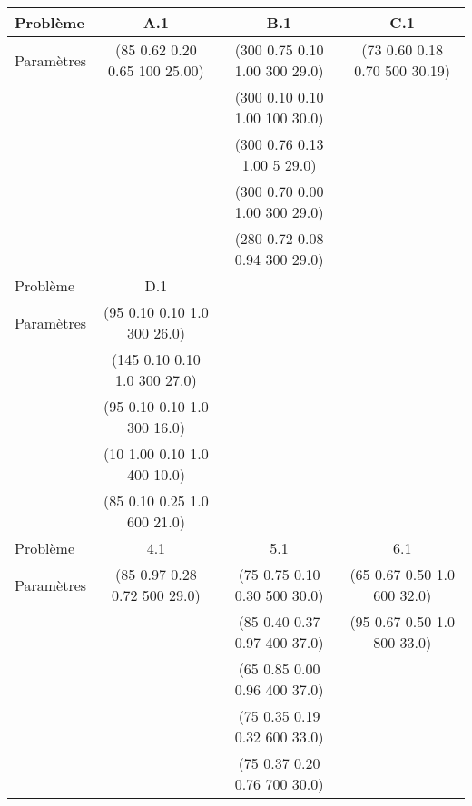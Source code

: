 \begin{tabular}{l*{3}{c}}
	\toprule
	Problème   & A.1                           & B.1                           & C.1 \\
	\midrule
	Paramètres & (85 0.62 0.20 0.65 100 25.00) & (300 0.75 0.10 1.00 300 29.0) & (73 0.60 0.18 0.70 500 30.19) \\
	           &                               & (300 0.10 0.10 1.00 100 30.0) & \\
	           &                               & (300 0.76 0.13 1.00 5   29.0) & \\
	           &                               & (300 0.70 0.00 1.00 300 29.0) & \\
	           &                               & (280 0.72 0.08 0.94 300 29.0) & \\
	\bottomrule
	\toprule
	Problème   & D.1 & & \\
	\midrule
	Paramètres & (95  0.10 0.10 1.0 300 26.0) & & \\
	           & (145 0.10 0.10 1.0 300 27.0) & & \\
	           & (95  0.10 0.10 1.0 300 16.0) & & \\
	           & (10  1.00 0.10 1.0 400 10.0) & & \\
	           & (85  0.10 0.25 1.0 600 21.0) & & \\
	\bottomrule
	\toprule
	Problème   & 4.1                          & 5.1                          & 6.1 \\
	\midrule
	Paramètres & (85 0.97 0.28 0.72 500 29.0) & (75 0.75 0.10 0.30 500 30.0) & (65 0.67 0.50 1.0 600 32.0) \\
	           &                              & (85 0.40 0.37 0.97 400 37.0) & (95 0.67 0.50 1.0 800 33.0) \\
	           &                              & (65 0.85 0.00 0.96 400 37.0) & \\
	           &                              & (75 0.35 0.19 0.32 600 33.0) & \\
	           &                              & (75 0.37 0.20 0.76 700 30.0) & \\
	\bottomrule
\end{tabular}

